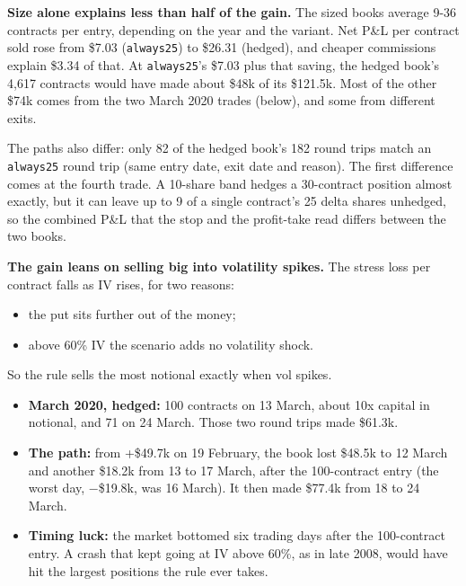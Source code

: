 \documentclass{article}
\begin{document}
\textbf{Size alone explains less than half of the gain.} The sized books average 9-36 contracts per entry, depending on the year and the variant. Net P\&L per contract sold rose from \$7.03 (\texttt{always25}) to \$26.31 (hedged), and cheaper commissions explain \$3.34 of that. At \texttt{always25}'s \$7.03 plus that saving, the hedged book's 4,617 contracts would have made about \$48k of its \$121.5k. Most of the other \$74k comes from the two March 2020 trades (below), and some from different exits.

The paths also differ: only 82 of the hedged book's 182 round trips match an \texttt{always25} round trip (same entry date, exit date and reason). The first difference comes at the fourth trade. A 10-share band hedges a 30-contract position almost exactly, but it can leave up to 9 of a single contract's 25 delta shares unhedged, so the combined P\&L that the stop and the profit-take read differs between the two books.

\textbf{The gain leans on selling big into volatility spikes.} The stress loss per contract falls as IV rises, for two reasons:

\begin{itemize}

\item the put sits further out of the money;

\item above 60\% IV the scenario adds no volatility shock.

\end{itemize}

So the rule sells the most notional exactly when vol spikes.

\begin{itemize}

\item \textbf{March 2020, hedged:} 100 contracts on 13 March, about 10x capital in notional, and 71 on 24 March. Those two round trips made \$61.3k.

\item \textbf{The path:} from +\$49.7k on 19 February, the book lost \$48.5k to 12 March and another \$18.2k from 13 to 17 March, after the 100-contract entry (the worst day, \ensuremath{-}\$19.8k, was 16 March). It then made \$77.4k from 18 to 24 March.

\item \textbf{Timing luck:} the market bottomed six trading days after the 100-contract entry. A crash that kept going at IV above 60\%, as in late 2008, would have hit the largest positions the rule ever takes.

\end{itemize}
\end{document}
